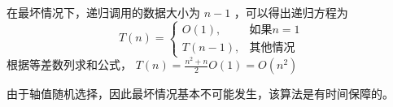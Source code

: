 \documentclass[UTF8]{ctexart}
\begin{document}
      在最坏情况下，递归调用的数据大小为 $n-1$ ，可以得出递归方程为
      \begin{equation}
        T(n) =
        \begin{cases}
          O(1), & \text{如果$n=1$} \\
          T(n - 1), & \text{其他情况}
        \end{cases}
      \end{equation}
      根据等差数列求和公式， $T(n) = \frac{n ^ 2 + n}{2} O(1) = O(n ^ 2)$

      由于轴值随机选择，因此最坏情况基本不可能发生，该算法是有时间保障的。
\end{document}
